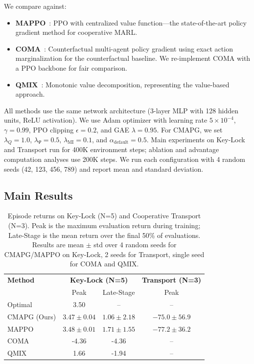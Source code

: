 \documentclass[journal]{IEEEtran}
\begin{document}
We compare against:
\begin{itemize}
    \item \textbf{MAPPO}~\cite{yu2022surprising}: PPO with centralized value function---the state-of-the-art policy gradient method for cooperative MARL.
    \item \textbf{COMA}~\cite{foerster2018counterfactual}: Counterfactual multi-agent policy gradient using exact action marginalization for the counterfactual baseline. We re-implement COMA with a PPO backbone for fair comparison.
    \item \textbf{QMIX}~\cite{rashid2018qmix}: Monotonic value decomposition, representing the value-based approach.
\end{itemize}

All methods use the same network architecture (3-layer MLP with 128 hidden units, ReLU activation). We use Adam optimizer with learning rate $5 \times 10^{-4}$, $\gamma = 0.99$, PPO clipping $\epsilon = 0.2$, and GAE $\lambda = 0.95$. For CMAPG, we set $\lambda_Q = 1.0$, $\lambda_\Psi = 0.5$, $\lambda_{\text{MI}} = 0.1$, and $\alpha_{\text{default}} = 0.5$. Main experiments on Key-Lock and Transport run for 400K environment steps; ablation and advantage computation analyses use 200K steps. We run each configuration with 4 random seeds (42, 123, 456, 789) and report mean and standard deviation.

\subsection{Main Results}

\begin{table}[t]
\centering
\caption{Episode returns on Key-Lock (N=5) and Cooperative Transport (N=3). Peak is the maximum evaluation return during training; Late-Stage is the mean return over the final 50\% of evaluations. Results are mean $\pm$ std over 4 random seeds for CMAPG/MAPPO on Key-Lock, 2 seeds for Transport, single seed for COMA and QMIX.}
\label{tab:main}
\begin{tabular}{lccc}
\toprule
\textbf{Method} & \multicolumn{2}{c}{\textbf{Key-Lock (N=5)}} & \textbf{Transport (N=3)} \\
& Peak & Late-Stage & Peak \\
\midrule
Optimal & 3.50 & -- & -- \\
CMAPG (Ours) & $3.47 \pm 0.04$ & $1.06 \pm 2.18$ & $-75.0 \pm 56.9$ \\
MAPPO & $\mathbf{3.48} \pm 0.01$ & $\mathbf{1.71} \pm 1.55$ & $\mathbf{-77.2} \pm 36.2$ \\
COMA & -4.36 & -4.36 & -- \\
QMIX & 1.66 & -1.94 & -- \\
\bottomrule
\end{tabular}
\end{table}
\end{document}
